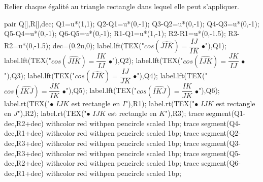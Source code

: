 \begin{corrige}
        Relier chaque égalité au triangle rectangle dans lequel elle peut s'appliquer.
    \begin{center}
        \begin{Geometrie}[CoinBG={(-2u,-5u)}]
            pair Q[],R[],dec;
            Q1=u*(1,1);
            Q2-Q1=u*(0,-1);
            Q3-Q2=u*(0,-1);
            Q4-Q3=u*(0,-1);
            Q5-Q4=u*(0,-1);
            Q6-Q5=u*(0,-1);
            R1-Q1=u*(1,-1);
            R2-R1=u*(0,-1.5);
            R3-R2=u*(0,-1.5);
            dec=(0.2u,0);
            label.lft(TEX("$cos(\widehat{JIK})=\dfrac{IJ}{IK}$ $\bullet$"),Q1);
            label.lft(TEX("$cos(\widehat{JIK})=\dfrac{IK}{IJ}$ $\bullet$"),Q2);
            label.lft(TEX("$cos(\widehat{IJK})=\dfrac{JK}{IJ}$ $\bullet$"),Q3);
            label.lft(TEX("$cos(\widehat{IJK})=\dfrac{IJ}{JK}$ $\bullet$"),Q4);
            label.lft(TEX("$cos(\widehat{IKJ})=\dfrac{JK}{IK}$ $\bullet$"),Q5);
            label.lft(TEX("$cos(\widehat{IKJ})=\dfrac{IK}{JK}$ $\bullet$"),Q6);
            label.rt(TEX("$\bullet$ $IJK$ est rectangle en $I$"),R1);
            label.rt(TEX("$\bullet$ $IJK$ est rectangle en $J$"),R2);
            label.rt(TEX("$\bullet$ $IJK$ est rectangle en $K$"),R3);
            trace segment(Q1-dec,R2+dec) withcolor red withpen pencircle scaled 1bp;
            trace segment(Q4-dec,R1+dec) withcolor red withpen pencircle scaled 1bp;
            trace segment(Q2-dec,R3+dec) withcolor red withpen pencircle scaled 1bp;
            trace segment(Q3-dec,R3+dec) withcolor red withpen pencircle scaled 1bp;
            trace segment(Q5-dec,R2+dec) withcolor red withpen pencircle scaled 1bp;
            trace segment(Q6-dec,R1+dec) withcolor red withpen pencircle scaled 1bp;
        \end{Geometrie}
    \end{center}
\end{corrige}

